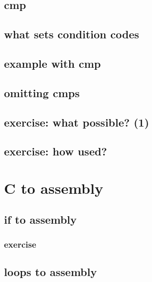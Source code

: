 \subsection{cmp}


\subsection{what sets condition codes}


\subsection{example with cmp}


\subsection{omitting cmps}


\subsection{exercise: what possible? (1)}


\subsection{exercise: how used?}



\section{C to assembly}

\subsection{if to assembly}



\subsubsection{exercise}



\subsection{loops to assembly}

